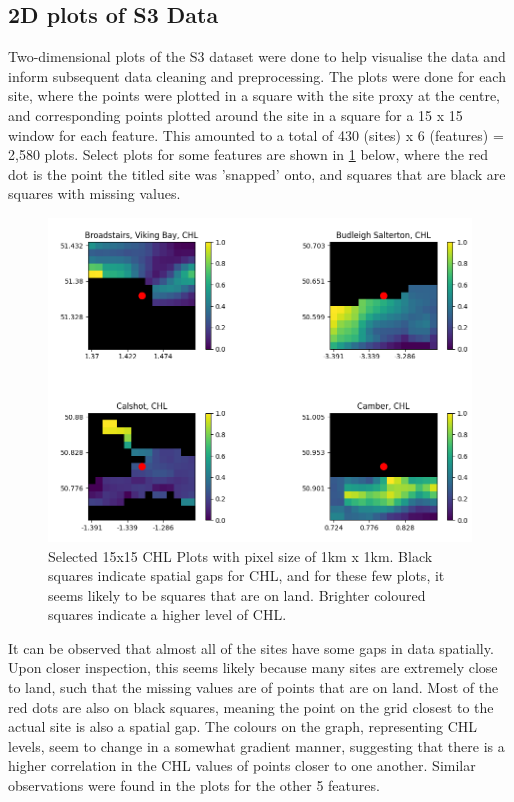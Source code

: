 \documentclass[a4paper,11pt]{report}
\begin{document}
\subsection{2D plots of S3 Data}

Two-dimensional plots of the S3 dataset were done to help visualise the data and inform subsequent data cleaning and preprocessing. The plots were done for each site, where the points were plotted in a square with the site proxy at the centre, and corresponding points plotted around the site in a square for a 15 x 15 window for each feature. This amounted to a total of 430 (sites) x 6 (features) = 2,580 plots. Select plots for some features are shown in \ref{fig:selected15x15chl} below, where the red dot is the point the titled site was 'snapped' onto, and squares that are black are squares with missing values. 

\begin{figure}[H]
    \centering
    \includegraphics[scale=0.7]{images/2d_plots_chl.png}
    \caption{Selected 15x15 CHL Plots with pixel size of 1km x 1km. Black squares indicate spatial gaps for CHL, and for these few plots, it seems likely to be squares that are on land. Brighter coloured squares indicate a higher level of CHL. }
    \label{fig:selected15x15chl}
\end{figure}

It can be observed that almost all of the sites have some gaps in data spatially. Upon closer inspection, this seems likely because many sites are extremely close to land, such that the missing values are of points that are on land. Most of the red dots are also on black squares, meaning the point on the grid closest to the actual site is also a spatial gap. The colours on the graph, representing CHL levels, seem to change in a somewhat gradient manner, suggesting that there is a higher correlation in the CHL values of points closer to one another. Similar observations were found in the plots for the other 5 features.
\end{document}
